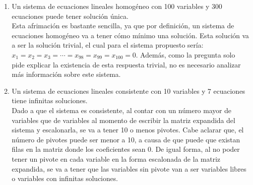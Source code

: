 \documentclass{article}
\begin{document}
\begin{enumerate}
\begin{enumerate}[label=\listAlph]
			\item Un sistema de ecuaciones lineales homogéneo con 100 variables y 300 ecuaciones puede tener solución única. \\
                Esta afrimación es bastante sencilla, ya que por definición, un sistema de ecuaciones homogéneo va a tener cómo mínimo una 
                solución. Esta solución va a ser la solución trivial, el cual para el sistema propuesto sería: \(x_1 = x_2 = x_3 = \cdots = x_{98} = x_{99} = x_{100} = 0\).
                Además, como la pregunta solo pide explicar la existencia de esta respuesta trivial, no es necesario analizar más información sobre este sistema.
			\item Un sistema de ecuaciones lineales consistente con 10 variables y 7 ecuaciones tiene infinitas soluciones. \\
                Dado a que el sistema es consistente, al contar con un número mayor de variables que de variables al momento de escribir la matriz expandida 
                del sistema y escalonarla, se va a tener 10 o menos pivotes. 
                Cabe aclarar que, el número de pivotes puede ser menor a 10, a causa de que puede que existan filas en la matriz donde los coeficientes sean 0. 
                De igual forma, al no poder tener un pivote en cada variable en la forma escalonada de la matriz expandida, se va a tener que las variables sin 
                pivote van a ser variables libres o variables con infinitas soluciones.
        \end{enumerate}


\end{enumerate}
\end{document}
